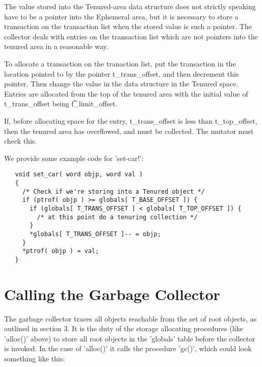 The value stored into the Tenured-area data structure does not strictly
speaking have to be a pointer into the Ephemeral area, but it is necessary
to store a transaction on the transaction list when the stored value is
such a pointer.  The collector deals with entries on the transaction list
which are not pointers into the tenured area in a reasonable way.

To allocate a transaction on the tranaction list, put the transaction in
the location pointed to by the pointer {\sc t\_trans\_offset}, and then decrement
this pointer. Then change the value in the data structure in the Tenured
space.  Entries are allocated from the top of the tenured area with the
initial value of {\sc t\_trans\_offset} being {\t t\_limit\_offset}.

If, before allocating space for the entry, {\sc t\_trans\_offset} is
less than {\sc t\_top\_offset}, then the tenured area has overflowed,
and must be collected. The mutator must check this.

We provide some example code for 'set-car!':

\begin{minipage}{\linewidth}
\begin{verbatim}
   void set_car( word objp, word val )
   {
     /* Check if we're storing into a Tenured object */
     if (ptrof( objp ) >= globals[ T_BASE_OFFSET ]) {
       if (globals[ T_TRANS_OFFSET ] < globals[ T_TOP_OFFSET ]) {
         /* at this point do a tenuring collection */
       }
       *globals[ T_TRANS_OFFSET ]-- = objp;
     }
     *ptrof( objp ) = val;
   }
\end{verbatim}
\end{minipage}


\section{Calling the Garbage Collector}

The garbage collector traces all objects reachable from the set of root
objects, as outlined in section 3.  It is the duty of the storage
allocating procedures (like 'alloc()' above) to store all root objects in
the 'globals' table before the collector is invoked. In the case of
'alloc()' it calls the procedure 'gc()', which could look something like
this:

